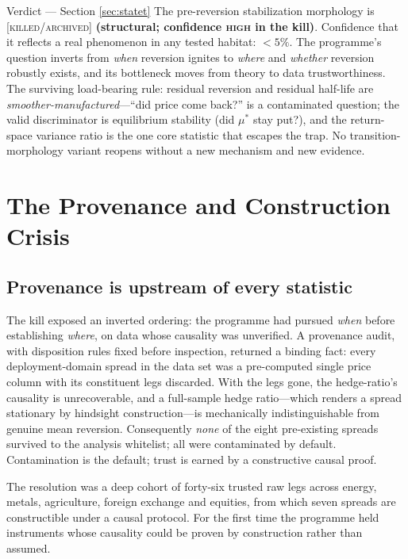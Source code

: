 \documentclass[11pt,a4paper]{article}
\newcommand{\status}[1]{{\small\textsc{[#1]}}}
\begin{document}
\begin{verdict}{Verdict --- Section \ref{sec:statet}}
\small
The pre-reversion stabilization morphology is \status{killed/archived} \textbf{(structural;
confidence \textsc{high} in the kill)}. Confidence that it reflects a real phenomenon in any tested
habitat: $<5\%$. The programme's question inverts from \emph{when} reversion ignites to \emph{where}
and \emph{whether} reversion robustly exists, and its bottleneck moves from theory to data
trustworthiness. The surviving load-bearing rule: residual reversion and residual half-life are
\emph{smoother-manufactured}---``did price come back?'' is a contaminated question; the valid
discriminator is equilibrium stability (did $\mu^*$ stay put?), and the return-space variance ratio is
the one core statistic that escapes the trap. No transition-morphology variant reopens without a new
mechanism and new evidence.
\end{verdict}

\section{The Provenance and Construction Crisis}
\label{sec:crisis}

\subsection{Provenance is upstream of every statistic}

The kill exposed an inverted ordering: the programme had pursued \emph{when} before establishing
\emph{where}, on data whose causality was unverified. A provenance audit, with disposition rules fixed
before inspection, returned a binding fact: every deployment-domain spread in the data set was a
pre-computed single price column with its constituent legs discarded. With the legs gone, the
hedge-ratio's causality is unrecoverable, and a full-sample hedge ratio---which renders a spread
stationary by hindsight construction---is mechanically indistinguishable from genuine mean reversion.
Consequently \emph{none} of the eight pre-existing spreads survived to the analysis whitelist; all were
contaminated by default. Contamination is the default; trust is earned by a constructive causal proof.

The resolution was a deep cohort of forty-six trusted raw legs across energy, metals, agriculture,
foreign exchange and equities, from which seven spreads are constructible under a causal protocol. For
the first time the programme held instruments whose causality could be proven by construction rather
than assumed.
\end{document}
